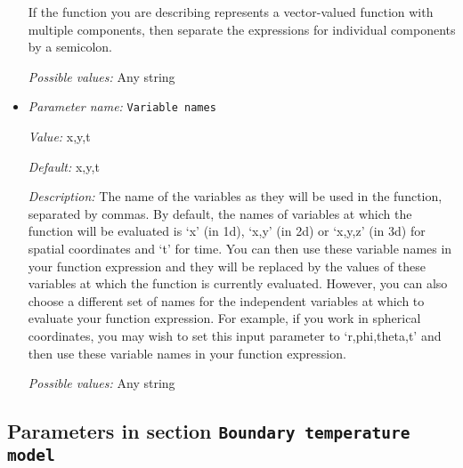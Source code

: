 \begin{itemize}
If the function you are describing represents a vector-valued function with multiple components, then separate the expressions for individual components by a semicolon.


{\it Possible values:} Any string
\item {\it Parameter name:} {\tt Variable names}
\label{parameters:Boundary heat flux model/Function/Variable names}


{\it Value:} x,y,t


{\it Default:} x,y,t


{\it Description:} The name of the variables as they will be used in the function, separated by commas. By default, the names of variables at which the function will be evaluated is `x' (in 1d), `x,y' (in 2d) or `x,y,z' (in 3d) for spatial coordinates and `t' for time. You can then use these variable names in your function expression and they will be replaced by the values of these variables at which the function is currently evaluated. However, you can also choose a different set of names for the independent variables at which to evaluate your function expression. For example, if you work in spherical coordinates, you may wish to set this input parameter to `r,phi,theta,t' and then use these variable names in your function expression.


{\it Possible values:} Any string
\end{itemize}

\subsection{Parameters in section \tt Boundary temperature model}
\label{parameters:Boundary_20temperature_20model}

